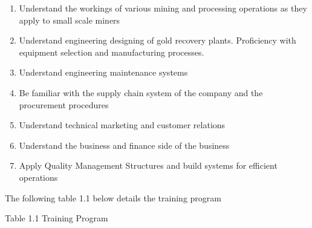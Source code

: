 \begin{enumerate}
\item  Understand the workings of various mining and processing operations as they apply to small scale miners

\item  Understand engineering designing of gold recovery plants. Proficiency with equipment selection and manufacturing processes. 

\item  Understand engineering maintenance systems

\item  Be familiar with the supply chain system of the company and the procurement procedures

\item  Understand technical marketing and customer relations

\item  Understand the business and finance side of the business

\item  Apply Quality Management Structures and build systems for efficient operations
\end{enumerate}

\noindent The following table 1.1 below details the training program

\noindent Table 1.1 Training Program

